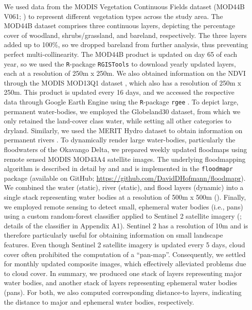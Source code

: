 \documentclass[abstract=on,10pt,a4paper,bibliography=totocnumbered]{article}
\begin{document}
We used data from the MODIS Vegetation Continuous Fields dataset (MOD44B V061;
\citealp{DiMiceli.2022}) to represent different vegetation types across the
study area. The MOD44B dataset comprises three continuous layers, depicting the
percentage cover of woodland, shrubs/grassland, and bareland, respectively. The
three layers added up to 100\%, so we dropped bareland from further analysis,
thus preventing perfect multi-collinearity. The MOD44B product is updated on day
65 of each year, so we used the \texttt{R}-package \texttt{RGISTools}
\citep{Perez-Goya.2020} to download yearly updated layers, each at a resolution
of 250m x 250m. We also obtained information on the NDVI through the MODIS
MOD13Q1 dataset \citep{Didan.2015}, which also has a resolution of 250m x 250m.
This product is updated every 16 days, and we accessed the respective data
through Google Earth Engine \citep{Gorelick.2017} using the \texttt{R}-package
\texttt{rgee} \citep{Aybar.2024}. To depict large, permanent water-bodies, we
employed the Globeland30 dataset, from which we only retained the land-cover
class water, while setting all other categories to dryland. Similarly, we used
the MERIT Hydro dataset to obtain information on permanent rivers
\citep{Yamazaki.2019}. To dynamically render large water-bodies, particularly
the floodwaters of the Okavango Delta, we prepared weekly updated floodmaps
using remote sensed MODIS MOD43A4 satellite images. The underlying floodmapping
algorithm is described in detail by \citet{Wolski.2017} and \citet{Hofmann.2021}
and is implemented in the \texttt{floodmapr} package (available on GitHub;
\url{https://github.com/DavidDHofmann/floodmapr}). We combined the water
(static), river (static), and flood layers (dynamic) into a single stack
representing water bodies at a resolution of 500m x 500m ().
Finally, we employed remote sensing to detect small, ephemeral water bodies
(i.e., pans) using a custom random-forest classifier applied to Sentinel 2
satellite imagery (\citealp{EuropeanSpaceAgency.2018}; details of the classifier
in Appendix A1). Sentinel 2 has a resolution of 10m and is therefore
particularly useful for obtaining information on small landscape features. Even
though Sentinel 2 satellite imagery is updated every 5 days, cloud cover often
prohibited the computation of a ``pan-map''. Consequently, we settled for
monthly updated composite images, which effectively alleviated problems due to
cloud cover. In summary, we produced one stack of layers representing major
water bodies, and another stack of layers representing ephemeral water bodies
(pans). For both, we also computed corresponding distance-to layers, indicating
the distance to major and ephemeral water bodies, respectively.
\end{document}
